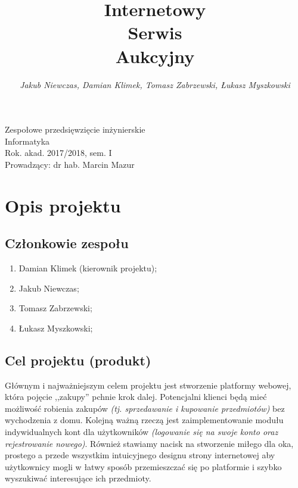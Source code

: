 \documentclass[a4paper]{article}
\title{\vspace{3cm} \bf{\Huge Internetowy\\ \vspace{0.2cm} Serwis\\ \vspace{0.4cm} Aukcyjny}}
\author{{\em Jakub Niewczas, Damian Klimek, Tomasz Zabrzewski, Łukasz Myszkowski}}
\date{}
\begin{document}
	
	\begin{titlepage}
		\thispagestyle{empty}
		\maketitle
		\vspace{8cm}
		\begin{center}
			Zespołowe przedsięwzięcie inżynierskie\\[2mm]
			
			Informatyka\\[2mm]
			
			Rok. akad. 2017/2018, sem. I\\[2mm]
			
			Prowadzący: dr hab. Marcin Mazur
		\end{center}
	\end{titlepage}
	
	\tableofcontents
	\thispagestyle{empty}
	
	\newpage
	
	\section{Opis projektu}
	
	\subsection{Członkowie zespołu}
	
	\begin{enumerate}
		\item Damian Klimek (kierownik projektu);
		\item Jakub Niewczas;
		\item Tomasz Zabrzewski;
		\item Łukasz Myszkowski;
	\end{enumerate}
	
	\subsection{Cel projektu (produkt)}
	
	Głównym i najważniejszym celem projektu jest stworzenie platformy webowej, która pojęcie ,,zakupy'' pchnie krok dalej. Potencjalni klienci będą mieć możliwość robienia zakupów \emph{(tj. sprzedawanie i kupowanie przedmiotów)} bez wychodzenia z domu. Kolejną ważną rzeczą jest zaimplementowanie modułu indywidualnych kont dla użytkowników \emph{(logowanie się na swoje konto oraz rejestrowanie nowego)}. Również stawiamy nacisk na stworzenie miłego dla oka, prostego a przede wszystkim intuicyjnego designu strony internetowej aby użytkownicy mogli w łatwy sposób przemieszczać się po platformie i szybko wyszukiwać interesujące ich przedmioty.
	
\end{document}
